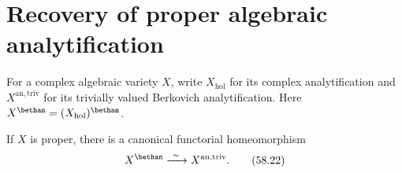\section{Recovery of proper algebraic analytification}
\label{sec:ts-algebraic}

For a complex algebraic variety $X$, write $X_{\mathrm{hol}}$ for
its complex analytification and $X^{\mathrm{an,triv}}$ for its
trivially valued Berkovich analytification. Here
$X^\bethan=(X_{\mathrm{hol}})^\bethan$.

\begin{theorem}\label{thm:ts-algebraic-recovery}
If $X$ is proper, there is a canonical functorial homeomorphism
\[
                         X^\bethan
                    \xrightarrow{\ \sim\ }
                         X^{\mathrm{an,triv}}.
\tag{58.22}\label{eq:ts-algebraic-recovery}
\]
\end{theorem}

